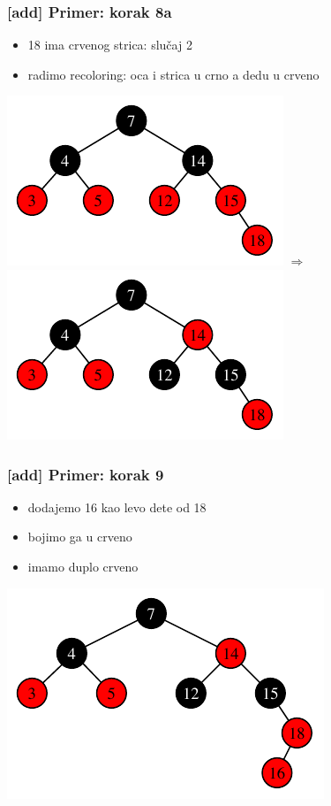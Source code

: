 \documentclass[compress,aspectratio=169]{beamer}
\begin{document}
\begin{frame}[fragile]
  \frametitle{[add] Primer: korak 8a}
  \begin{itemize}
    \item 18 ima crvenog strica: slučaj 2
    \item radimo recoloring: oca i strica u crno a dedu u crveno
  \end{itemize}
  \begin{center}
    \includegraphics[scale=0.8]{asp-11-add-11.pdf} $\Rightarrow$
    \includegraphics[scale=0.8]{asp-11-add-12.pdf}
  \end{center}
\end{frame}

\begin{frame}[fragile]
  \frametitle{[add] Primer: korak 9}
  \begin{itemize}
    \item dodajemo 16 kao levo dete od 18
    \item bojimo ga u crveno
    \item imamo duplo crveno
  \end{itemize}
  \begin{center}
    \includegraphics[scale=0.8]{asp-11-add-13.pdf}
  \end{center}
\end{frame}
\end{document}
